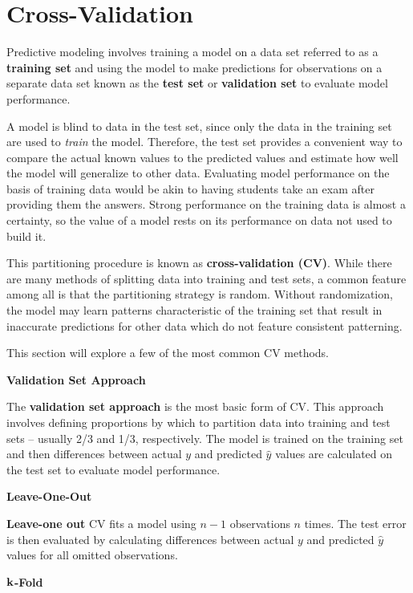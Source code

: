 \documentclass[
]{book}
\begin{document}
\hypertarget{cross-validation}{%
\section{Cross-Validation}\label{cross-validation}}

Predictive modeling involves training a model on a data set referred to as a \textbf{training set} and using the model to make predictions for observations on a separate data set known as the \textbf{test set} or \textbf{validation set} to evaluate model performance.

A model is blind to data in the test set, since only the data in the training set are used to \emph{train} the model. Therefore, the test set provides a convenient way to compare the actual known values to the predicted values and estimate how well the model will generalize to other data. Evaluating model performance on the basis of training data would be akin to having students take an exam after providing them the answers. Strong performance on the training data is almost a certainty, so the value of a model rests on its performance on data not used to build it.

This partitioning procedure is known as \textbf{cross-validation (CV)}. While there are many methods of splitting data into training and test sets, a common feature among all is that the partitioning strategy is random. Without randomization, the model may learn patterns characteristic of the training set that result in inaccurate predictions for other data which do not feature consistent patterning.

This section will explore a few of the most common CV methods.

\textbf{Validation Set Approach}

The \textbf{validation set approach} is the most basic form of CV. This approach involves defining proportions by which to partition data into training and test sets -- usually 2/3 and 1/3, respectively. The model is trained on the training set and then differences between actual \(y\) and predicted \(\hat y\) values are calculated on the test set to evaluate model performance.

\textbf{Leave-One-Out}

\textbf{Leave-one out} CV fits a model using \(n-1\) observations \(n\) times. The test error is then evaluated by calculating differences between actual \(y\) and predicted \(\hat y\) values for all omitted observations.

\(\textbf k\)\textbf{-Fold}
\end{document}

